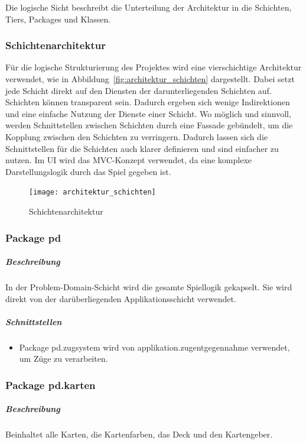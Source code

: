 \documentclass[12pt,halfparskip]{scrartcl}
\begin{document}
Die logische Sicht beschreibt die Unterteilung der Architektur in die Schichten, Tiers, Packages und Klassen. 

\subsubsection{Schichtenarchitektur} %
\label{sub:schichtenarchitektur}
Für die logische Strukturierung des Projektes wird eine vierschichtige Architektur verwendet, wie in Abbildung~\vref{fig:architektur_schichten} dargestellt. Dabei setzt jede Schicht direkt auf den Diensten der darunterliegenden Schichten auf. Schichten können transparent sein. Dadurch ergeben sich wenige Indirektionen und eine einfache Nutzung der Dienste einer Schicht. Wo möglich und sinnvoll, werden Schnittstellen zwischen Schichten durch eine Fassade gebündelt, um die Kopplung zwischen den Schichten zu verringern. Dadurch lassen sich die Schnittstellen für die Schichten auch klarer definieren und sind einfacher zu nutzen. Im UI wird das MVC-Konzept verwendet, da eine komplexe Darstellungslogik durch das Spiel gegeben ist.
\begin{figure}
	\centering
	\texttt{[image: architektur\_schichten]}
	\caption{Schichtenarchitektur}
	\label{fig:architektur_schichten}
\end{figure}

\clearpage

\subsubsection{Package pd} %
\label{ssub:package_pd}
\subparagraph{Beschreibung}
In der Problem-Domain-Schicht wird die gesamte Spiellogik gekapselt. Sie wird direkt von der darüberliegenden Applikationsschicht verwendet.

\subparagraph{Schnittstellen} %
\label{ssub:schnittstellen}
\begin{itemize}
	\item Package pd.zugsystem wird von applikation.zugentgegennahme verwendet, um Züge zu verarbeiten.
\end{itemize}

\subsubsection{Package pd.karten} %
\label{ssub:package_pd_karten}
\subparagraph{Beschreibung}
Beinhaltet alle Karten, die Kartenfarben, das Deck und den Kartengeber. 
\end{document}
